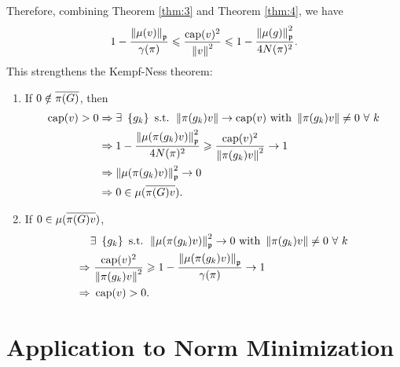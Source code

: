 \documentclass[suri,pdfbookmark]{engsuribt} %
\begin{document}
  Therefore, combining Theorem \ref{thm:3} and Theorem \ref{thm:4}, we have 
  \begin{equation}\label{in:6}
    1 - \frac{\left\lVert\mu(v)\right\lVert_{\mathfrak{p}}}{\gamma(\pi)} \leqslant \frac{\operatorname{cap}(v)^2}{\left\lVert v\right\lVert^2} \leqslant 1 - \frac{\left\lVert\mu(g)\right\lVert_{\mathfrak{p}}^2}{4N(\pi)^2}.
  \end{equation}
  This strengthens the Kempf-Ness theorem: 
  \begin{enumerate}[label = (\arabic*)]
    \item If $0 \notin \overline{\pi(G)}$, then
    \begin{equation*}
      \begin{split}
        \operatorname{cap}(v) > 0 & \Rightarrow \exists~\left\{g_k\right\} \text{ s.t. } \left\lVert\pi(g_k)v\right\lVert \rightarrow \operatorname{cap}(v) \text{ with }\left\lVert\pi(g_k)v\right\lVert \neq 0~\forall~k \\
        &\Rightarrow 1 - \frac{\left\lVert\mu({\pi(g_k)v)}\right\lVert_{\mathfrak{p}}^2}{4N(\pi)^2} \geqslant \frac{\operatorname{cap}(v)^2}{\left\lVert\pi(g_k)v\right\lVert^2} \rightarrow 1 \\
        &\Rightarrow \left\lVert\mu({\pi(g_k)v)}\right\lVert_{\mathfrak{p}}^2 \rightarrow 0 \\
        &\Rightarrow 0 \in \mu(\overline{\pi(G)v}).
      \end{split} 
    \end{equation*} 
    \item If $0 \in \mu(\overline{\pi(G)v})$,
    \begin{equation*}
      \begin{split}
        &\exists~\left\{g_k\right\} \text{ s.t. } \left\lVert\mu({\pi(g_k)v)}\right\lVert_{\mathfrak{p}}^2 \rightarrow 0 \text{ with }\left\lVert\pi(g_k)v\right\lVert \neq 0~\forall~k \\
        \Rightarrow &~ \frac{\operatorname{cap}(v)^2}{\left\lVert\pi(g_k)v\right\lVert^2} \geqslant 1 - \frac{\left\lVert\mu(\pi(g_k)v)\right\lVert_{\mathfrak{p}}}{\gamma(\pi)} \rightarrow 1\\
        \Rightarrow &~ \operatorname{cap}(v)> 0.
      \end{split}
    \end{equation*}
  \end{enumerate}

  \section{Application to Norm Minimization}
\end{document}
